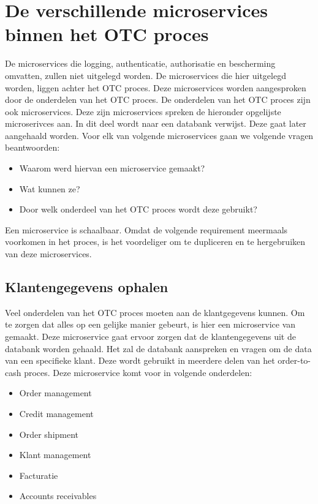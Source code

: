 \section{De verschillende microservices binnen het OTC proces}
De microservices die logging, authenticatie, authorisatie en bescherming omvatten, zullen niet uitgelegd worden.
De microservices die hier uitgelegd worden, liggen achter het OTC proces. Deze microservices worden aangesproken door de onderdelen van het OTC proces. 
De onderdelen van het OTC proces zijn ook microservices. Deze zijn microservices spreken de hieronder opgelijste microserivces aan.
In dit deel wordt naar een databank verwijst. Deze gaat later aangehaald worden.
Voor elk van volgende microservices gaan we volgende vragen beantwoorden:
\begin{itemize}
	\item Waarom werd hiervan een microservice gemaakt?
	\item Wat kunnen ze?
	\item Door welk onderdeel van het OTC proces wordt deze gebruikt?
\end{itemize}

Een microservice is schaalbaar. Omdat de volgende requirement meermaals voorkomen in het proces, is het voordeliger om te dupliceren en te hergebruiken van deze microservices. 

\subsection{Klantengegevens ophalen}
Veel onderdelen van het OTC proces moeten aan de klantgegevens kunnen. Om te zorgen dat alles op een gelijke manier gebeurt, is hier een microservice van gemaakt.
Deze microservice gaat ervoor zorgen dat de klantengegevens uit de databank worden gehaald. Het zal de databank aanspreken en vragen om de data van een specifieke klant. 
Deze wordt gebruikt in meerdere delen van het order-to-cash proces. 
Deze microservice komt voor in volgende onderdelen:
\begin{itemize}
	\item Order management
	\item Credit management
	\item Order shipment
	\item Klant management
	\item Facturatie
	\item Accounts receivables
\end{itemize}

